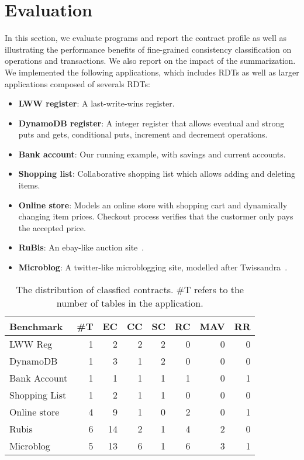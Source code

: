 \section{Evaluation}

In this section, we evaluate \name programs and report the contract profile as
well as illustrating the performance benefits of fine-grained consistency
classification on operations and transactions. We also report on the impact of
the summarization. We implemented the following applications, which includes
RDTs as well as larger applications composed of severals RDTs:

\begin{itemize}
\item \textbf{LWW register}: A last-write-wins register.
\item \textbf{DynamoDB register}: A integer register that allows eventual and
strong puts and gets, conditional puts, increment and decrement operations.
\item \textbf{Bank account}: Our running example, with savings and current
accounts.
\item \textbf{Shopping list}: Collaborative shopping list which allows adding
and deleting items.
\item \textbf{Online store}: Models an online store with shopping cart and
dynamically changing item prices. Checkout process verifies that the custormer
only pays the accepted price.
\item \textbf{RuBis}: An ebay-like auction site~\cite{}.
\item \textbf{Microblog}: A twitter-like microblogging site, modelled after
Twissandra~\cite{}.
\end{itemize}

\begin{table}
\setlength{\tabcolsep}{4pt}
{\sffamily \small
\begin{center}
\begin{tabular} {|l|r|r|r|r|r|r|r|}
\hline
{\bf Benchmark} & {\bf \#T} & {\bf EC} & {\bf CC} & {\bf SC} & {\bf RC} & {\bf MAV} & {\bf RR} \\
\hline
{LWW Reg} & 1 & 2 & 2 & 2 & 0 & 0 & 0 \\
{DynamoDB} & 1 & 3 & 1 & 2 & 0 & 0 & 0 \\
{Bank Account} & 1 & 1 & 1 & 1 & 1 & 0 & 1 \\
{Shopping List} & 1 & 2 & 1 & 1 & 0 & 0 & 0 \\
{Online store} & 4 & 9 & 1 & 0 & 2 & 0 & 1 \\
{Rubis} & 6 & 14 & 2 & 1 & 4 & 2 & 0 \\
{Microblog} & 5 & 13 & 6 & 1 & 6 & 3 & 1 \\
\hline
\end{tabular}
\end{center}
}
\caption{The distribution of classfied contracts. \#T refers to the number of tables in the application.}
\label{tab:ctrts}
\end{table}

